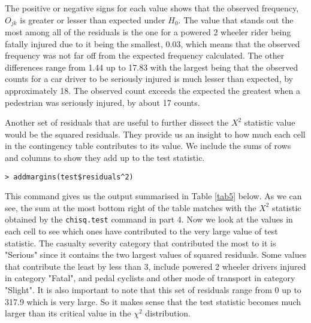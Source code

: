 \documentclass[11pt,a4]{article}
\begin{document}
\begin{enumerate}
The positive or negative signs for each value shows that the observed frequency, $O_{jk}$ is greater or lesser than expected  under $H_{0}$. The value that stands out the most among all of the residuals is the one for a powered 2 wheeler rider being fatally injured due to it being the smallest, 0.03, which means that the observed frequency was not far off from the expected frequency calculated. The other differences range from 1.44 up to 17.83 with the largest being that the observed counts for a car driver to be seriously injured is much lesser than expected, by approximately 18. The observed count exceeds the expected the greatest when a pedestrian was seriously injured, by about 17 counts.

\bigskip

Another set of residuals that are useful to further dissect the $X^2$ statistic value would be the squared residuals. They provide us an insight to how much each cell in the contingency table contributes to its value. We include the sums of rows and columns to show they add up to the test statistic.

\begin{verbatim}
> addmargins(test$residuals^2)
\end{verbatim}

This command gives us the output summarised in Table \ref{tab5} below. As we can see, the sum at the most bottom right of the table matches with the $X^2$ statistic obtained by the \verb|chisq.test| command in part 4. Now we look at the values in each cell to see which ones have contributed to the very large value of test statistic. The casualty severity category that contributed the most to it is "Serious" since it contains the two largest values of squared residuals. Some values that contribute the least by less than 3, include powered 2 wheeler drivers injured in category "Fatal", and pedal cyclists and other mode of transport in category "Slight". It is also important to note that this set of residuals range from 0 up to 317.9 which is very large. So it makes sense that the test statistic becomes much larger than its critical value in the ${\chi}^2$ distribution. 

\bigskip


\end{enumerate}
\end{document}
